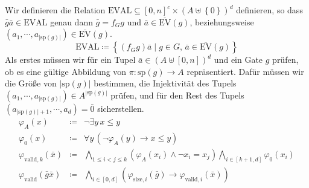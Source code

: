 Wir definieren die Relation $\mathrm{EVAL}\subseteq\left[0,n\right]^{c}\times\left(A\uplus\left\{ 0\right\} \right)^{d}$
definieren, so dass $\bar{g}\bar{a}\in\mathrm{EVAL}$ genau dann $\bar{g}=f_{G}g$
und $\bar{a}\in\overline{\mathrm{EV}}\left(g\right)$, beziehungsweise
$\left(a_{1},\cdots,a_{\left|\mathrm{sp}\left(g\right)\right|}\right)\in\bar{\mathrm{EV}}\left(g\right)$.
\[
\mathrm{EVAL}\coloneqq\left\{ \left(f_{G}g\right)\bar{a}\mid g\in G,\,\bar{a}\in\overline{\mathrm{EV}}\left(g\right)\right\} 
\]
Als erstes müssen wir für ein Tupel $\bar{a}\in\left(A\uplus\left[0,n\right]\right)^{d}$
und ein Gate $g$ prüfen, ob es eine gültige Abbildung von $\pi:\mathrm{sp}\left(g\right)\rightarrow A$
repräsentiert. Dafür müssen wir die Größe von $\left|\mathrm{sp}\left(g\right)\right|$
bestimmen, die Injektivität des Tupels $\left(a_{1},\cdots,a_{\left|\mathrm{sp}\left(g\right)\right|}\right)\in A^{\left|\mathrm{sp}\left(g\right)\right|}$
prüfen, und für den Rest des Tupels $\left(a_{\left|\mathrm{sp}\left(g\right)\right|+1},\cdots,a_{d}\right)=\bar{0}$
sicherstellen. 
\begin{eqnarray*}
\varphi_{A}\left(x\right) & \coloneqq & \neg\exists y\,x\leqslant y\\
\varphi_{0}\left(x\right) & \coloneqq & \forall y\,\left(\neg\varphi_{A}\left(y\right)\rightarrow x\leqslant y\right)\\
\varphi_{\mathrm{valid},k}\left(\bar{x}\right) & \coloneqq & \bigwedge_{1\leqslant i<j\leqslant k}\left(\varphi_{A}\left(x_{i}\right)\wedge\neg x_{i}=x_{j}\right)\bigwedge_{i\in\left[k+1,d\right]}\varphi_{0}\left(x_{i}\right)\\
\varphi_{\mathrm{valid}}\left(\bar{g}\bar{x}\right) & \coloneqq & \bigwedge_{i\in\left[0,d\right]}\left(\varphi_{\mathrm{size},i}\left(\bar{g}\right)\rightarrow\varphi_{\mathrm{valid},i}\left(\bar{x}\right)\right)
\end{eqnarray*}

